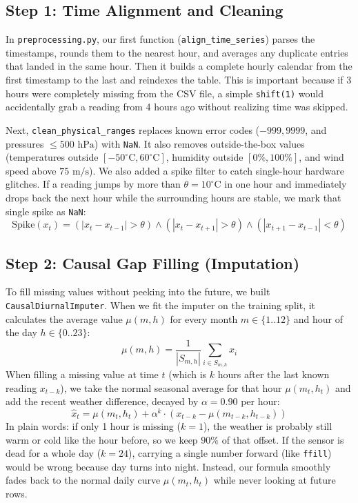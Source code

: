 \documentclass[conference]{IEEEtran}
\begin{document}
\subsection{Step 1: Time Alignment and Cleaning}
In \texttt{preprocessing.py}, our first function (\texttt{align\_time\_series}) parses the timestamps, rounds them to the nearest hour, and averages any duplicate entries that landed in the same hour. Then it builds a complete hourly calendar from the first timestamp to the last and reindexes the table. This is important because if 3 hours were completely missing from the CSV file, a simple \texttt{shift(1)} would accidentally grab a reading from 4 hours ago without realizing time was skipped.

Next, \texttt{clean\_physical\_ranges} replaces known error codes ($-999, 9999$, and pressures $\le 500\text{ hPa}$) with \texttt{NaN}. It also removes outside-the-box values (temperatures outside $[-50^\circ\text{C}, 60^\circ\text{C}]$, humidity outside $[0\%, 100\%]$, and wind speed above $75\text{ m/s}$). We also added a spike filter to catch single-hour hardware glitches. If a reading jumps by more than $\theta = 10^\circ\text{C}$ in one hour and immediately drops back the next hour while the surrounding hours are stable, we mark that single spike as \texttt{NaN}:
\begin{equation}
\text{Spike}(x_t) = (|x_t - x_{t-1}| > \theta) \land (|x_t - x_{t+1}| > \theta) \land (|x_{t+1} - x_{t-1}| < \theta)
\end{equation}

\subsection{Step 2: Causal Gap Filling (Imputation)}
To fill missing values without peeking into the future, we built \texttt{CausalDiurnalImputer}. When we fit the imputer on the training split, it calculates the average value $\mu(m, h)$ for every month $m \in \{1..12\}$ and hour of the day $h \in \{0..23\}$:
\begin{equation}
\mu(m, h) = \frac{1}{|S_{m,h}|} \sum_{i \in S_{m,h}} x_i
\end{equation}
When filling a missing value at time $t$ (which is $k$ hours after the last known reading $x_{t-k}$), we take the normal seasonal average for that hour $\mu(m_t, h_t)$ and add the recent weather difference, decayed by $\alpha = 0.90$ per hour:
\begin{equation}
\hat{x}_t = \mu(m_t, h_t) + \alpha^k \cdot \left(x_{t-k} - \mu(m_{t-k}, h_{t-k})\right)
\end{equation}
In plain words: if only 1 hour is missing ($k=1$), the weather is probably still warm or cold like the hour before, so we keep $90\%$ of that offset. If the sensor is dead for a whole day ($k=24$), carrying a single number forward (like \texttt{ffill}) would be wrong because day turns into night. Instead, our formula smoothly fades back to the normal daily curve $\mu(m_t, h_t)$ while never looking at future rows.
\end{document}

